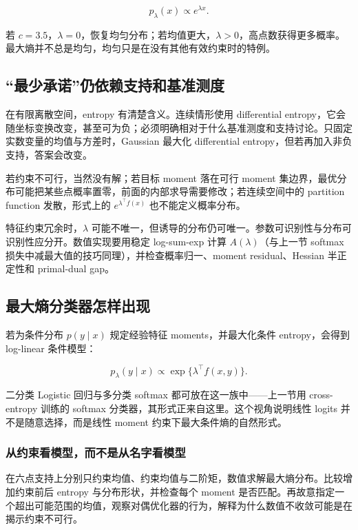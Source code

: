 \[
p_\lambda(x)\propto e^{\lambda x}.
\]

若 \(c=3.5\)，\(\lambda=0\)，恢复均匀分布；若均值更大，\(\lambda>0\)，高点数获得更多概率。最大熵并不总是均匀，均匀只是在没有其他有效约束时的特例。

\subsection{``最少承诺''仍依赖支持和基准测度}

在有限离散空间，entropy 有清楚含义。连续情形使用 differential entropy，它会随坐标变换改变，甚至可为负；必须明确相对于什么基准测度和支持讨论。只固定实数变量的均值与方差时，Gaussian 最大化 differential entropy，但若再加入非负支持，答案会改变。

若约束不可行，当然没有解；若目标 moment 落在可行 moment 集边界，最优分布可能把某些点概率置零，前面的内部求导需要修改；若连续空间中的 partition function 发散，形式上的 \(e^{\lambda^\top f(x)}\) 也不能定义概率分布。

特征约束冗余时，\(\lambda\) 可能不唯一，但诱导的分布仍可唯一。参数可识别性与分布可识别性应分开。数值实现要用稳定 log-sum-exp 计算 \(A(\lambda)\)（与上一节 softmax 损失中减最大值的技巧同理），并检查概率归一、moment residual、Hessian 半正定性和 primal-dual gap。

\subsection{最大熵分类器怎样出现}

若为条件分布 \(p(y\mid x)\) 规定经验特征 moments，并最大化条件 entropy，会得到 log-linear 条件模型：

\[
p_\lambda(y\mid x)
\propto\exp\{\lambda^\top f(x,y)\}.
\]

二分类 Logistic 回归与多分类 softmax 都可放在这一族中——上一节用 cross-entropy 训练的 softmax 分类器，其形式正来自这里。这个视角说明线性 logits 并不是随意选择，而是线性 moment 约束下最大条件熵的自然形式。

\subsubsection{从约束看模型，而不是从名字看模型}

在六点支持上分别只约束均值、约束均值与二阶矩，数值求解最大熵分布。比较增加约束前后 entropy 与分布形状，并检查每个 moment 是否匹配。再故意指定一个超出可能范围的均值，观察对偶优化器的行为，解释为什么数值不收敛可能是在揭示约束不可行。
